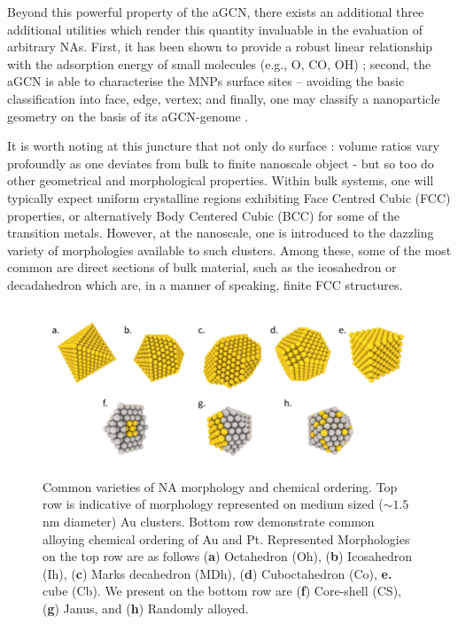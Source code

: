 Beyond this powerful property of the aGCN, there exists an additional three additional utilities which render this quantity invaluable in the evaluation of arbitrary NAs. First, it has been shown to provide a robust linear relationship with the adsorption energy of small molecules (e.g., O, CO, OH) \cite{Calle2015}; second, the aGCN is able to characterise the MNPs surface sites -- avoiding the basic classification into face, edge, vertex; and finally, one may classify a nanoparticle geometry on the basis of its aGCN-genome \cite{Rossi2019}.
%
 
It is worth noting at this juncture that not only do surface : volume ratios vary profoundly as one deviates from  bulk to finite nanoscale object - but so too do other geometrical and morphological properties. Within bulk systems, one will typically expect uniform crystalline regions exhibiting Face Centred Cubic (FCC) properties, or alternatively Body Centered Cubic (BCC) for some of the transition metals. However, at the nanoscale, one is introduced to the dazzling variety of morphologies available to such clusters. Among these, some of the most common are direct sections of bulk material, such as the icosahedron or decadahedron which are, in a manner of speaking, finite FCC structures. 

\begin{figure}
    \centering
    \includegraphics{figures/Theory/Strut_ex.pdf}
    \caption{Common varieties of NA morphology and chemical ordering. Top row is indicative of morphology represented on medium sized ($\sim 1.5$ nm diameter) Au clusters. Bottom row demonstrate common alloying chemical ordering of Au and Pt. Represented Morphologies on the top row are as follows (\textbf{a}) Octahedron (Oh), (\textbf{b}) Icosahedron (Ih), (\textbf{c}) Marks decahedron (MDh), (\textbf{d}) Cuboctahedron (Co), \textbf{e.} cube (Cb). We present on the bottom row are (\textbf{f}) Core-shell (CS), (\textbf{g}) Janus, and (\textbf{h}) Randomly alloyed.
    }
    \label{fig:struts_example}
\end{figure}

